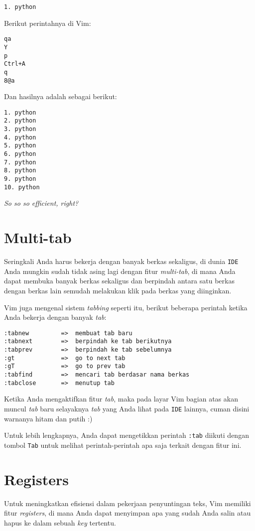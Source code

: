 \documentclass{article}
\begin{document}
\begin{verbatim}
1. python
\end{verbatim}

Berikut perintahnya di Vim:

\begin{verbatim}
qa
Y
p
Ctrl+A
q
8@a
\end{verbatim}

Dan hasilnya adalah sebagai berikut:

\begin{verbatim}
1. python
2. python
3. python
4. python
5. python
6. python
7. python
8. python
9. python
10. python
\end{verbatim}

\emph{So so so efficient, right?}

\section{Multi-tab}
Seringkali Anda harus bekerja dengan banyak berkas
sekaligus, di dunia \verb=IDE= Anda mungkin sudah tidak
asing lagi dengan fitur \emph{multi-tab}, di mana Anda dapat
membuka banyak berkas sekaligus dan berpindah antara satu
berkas dengan berkas lain semudah melakukan klik pada berkas
yang diinginkan.

Vim juga mengenal sistem \emph{tabbing} seperti itu, berikut
beberapa perintah ketika Anda bekerja dengan banyak
\emph{tab}:

\begin{verbatim}
:tabnew         =>  membuat tab baru
:tabnext        =>  berpindah ke tab berikutnya
:tabprev        =>  berpindah ke tab sebelumnya
:gt             =>  go to next tab
:gT             =>  go to prev tab
:tabfind        =>  mencari tab berdasar nama berkas
:tabclose       =>  menutup tab
\end{verbatim}

Ketika Anda mengaktifkan fitur \emph{tab}, maka pada layar
Vim bagian atas akan muncul \emph{tab} baru selayaknya
\emph{tab} yang Anda lihat pada \verb=IDE= lainnya, cuman
disini warnanya hitam dan putih :)

Untuk lebih lengkapnya, Anda dapat mengetikkan perintah
\verb=:tab= diikuti dengan tombol \verb=Tab= untuk melihat
perintah-perintah apa saja terkait dengan fitur ini.

\section{Registers}
Untuk meningkatkan efisiensi dalam pekerjaan penyuntingan
teks, Vim memiliki fitur \emph{registers}, di mana Anda
dapat menyimpan apa yang sudah Anda salin atau hapus ke
dalam sebuah \emph{key} tertentu.
\end{document}
